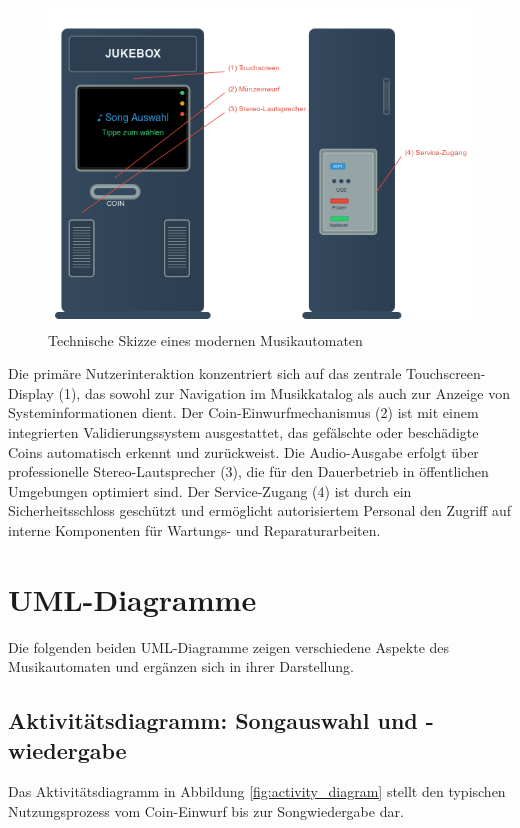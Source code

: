 \documentclass[12pt,oneside]{article}
\begin{document}
\begin{figure}[H]
    \centering
    \includegraphics[width=\textwidth]{images/jukebox_technical_sketch.png}
    \caption{Technische Skizze eines modernen Musikautomaten}
    \label{fig:jukebox_skizze}
\end{figure}
\noindent
Die primäre Nutzerinteraktion konzentriert sich auf das zentrale Touchscreen-Display (1), das sowohl zur Navigation im Musikkatalog als auch zur Anzeige von Systeminformationen dient. Der Coin-Einwurfmechanismus (2) ist mit einem integrierten Validierungssystem ausgestattet, das gefälschte oder beschädigte Coins automatisch erkennt und zurückweist. Die Audio-Ausgabe erfolgt über professionelle Stereo-Lautsprecher (3), die für den Dauerbetrieb in öffentlichen Umgebungen optimiert sind. Der Service-Zugang (4) ist durch ein Sicherheitsschloss geschützt und ermöglicht autorisiertem Personal den Zugriff auf interne Komponenten für Wartungs- und Reparaturarbeiten.

\section{UML-Diagramme} \label{sec:uml_diagramme}
Die folgenden beiden UML-Diagramme zeigen verschiedene Aspekte des Musikautomaten und ergänzen sich in ihrer Darstellung.

\subsection{Aktivitätsdiagramm: Songauswahl und -wiedergabe}
Das Aktivitätsdiagramm in Abbildung \ref{fig:activity_diagram} stellt den typischen Nutzungsprozess vom Coin-Einwurf bis zur Songwiedergabe dar.
\end{document}
